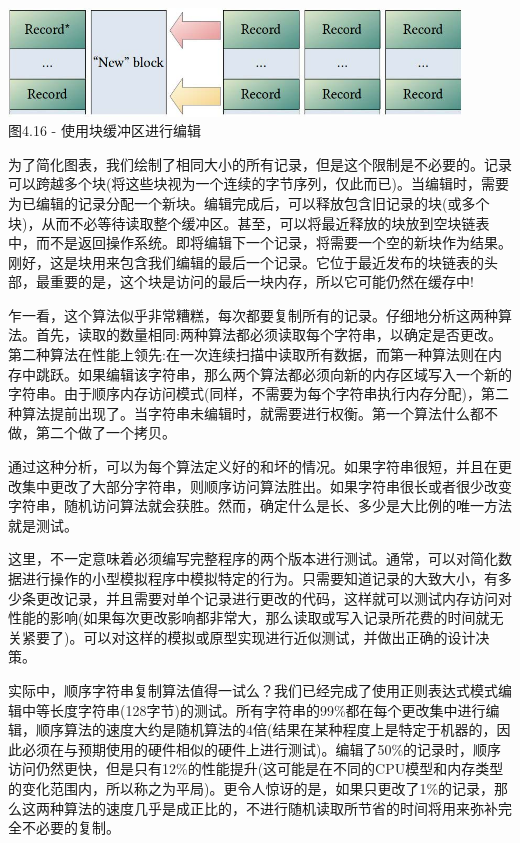 \begin{center}
\includegraphics[width=0.9\textwidth]{content/1/chapter4/images/16.jpg}\\
图4.16 - 使用块缓冲区进行编辑
\end{center}

为了简化图表，我们绘制了相同大小的所有记录，但是这个限制是不必要的。记录可以跨越多个块(将这些块视为一个连续的字节序列，仅此而已)。当编辑时，需要为已编辑的记录分配一个新块。编辑完成后，可以释放包含旧记录的块(或多个块)，从而不必等待读取整个缓冲区。甚至，可以将最近释放的块放到空块链表中，而不是返回操作系统。即将编辑下一个记录，将需要一个空的新块作为结果。刚好，这是块用来包含我们编辑的最后一个记录。它位于最近发布的块链表的头部，最重要的是，这个块是访问的最后一块内存，所以它可能仍然在缓存中!

乍一看，这个算法似乎非常糟糕，每次都要复制所有的记录。仔细地分析这两种算法。首先，读取的数量相同:两种算法都必须读取每个字符串，以确定是否更改。第二种算法在性能上领先:在一次连续扫描中读取所有数据，而第一种算法则在内存中跳跃。如果编辑该字符串，那么两个算法都必须向新的内存区域写入一个新的字符串。由于顺序内存访问模式(同样，不需要为每个字符串执行内存分配)，第二种算法提前出现了。当字符串未编辑时，就需要进行权衡。第一个算法什么都不做，第二个做了一个拷贝。

通过这种分析，可以为每个算法定义好的和坏的情况。如果字符串很短，并且在更改集中更改了大部分字符串，则顺序访问算法胜出。如果字符串很长或者很少改变字符串，随机访问算法就会获胜。然而，确定什么是长、多少是大比例的唯一方法就是测试。

这里，不一定意味着必须编写完整程序的两个版本进行测试。通常，可以对简化数据进行操作的小型模拟程序中模拟特定的行为。只需要知道记录的大致大小，有多少条更改记录，并且需要对单个记录进行更改的代码，这样就可以测试内存访问对性能的影响(如果每次更改影响都非常大，那么读取或写入记录所花费的时间就无关紧要了)。可以对这样的模拟或原型实现进行近似测试，并做出正确的设计决策。

实际中，顺序字符串复制算法值得一试么？我们已经完成了使用正则表达式模式编辑中等长度字符串(128字节)的测试。所有字符串的99\%都在每个更改集中进行编辑，顺序算法的速度大约是随机算法的4倍(结果在某种程度上是特定于机器的，因此必须在与预期使用的硬件相似的硬件上进行测试)。编辑了50\%的记录时，顺序访问仍然更快，但是只有12\%的性能提升(这可能是在不同的CPU模型和内存类型的变化范围内，所以称之为平局)。更令人惊讶的是，如果只更改了1\%的记录，那么这两种算法的速度几乎是成正比的，不进行随机读取所节省的时间将用来弥补完全不必要的复制。

